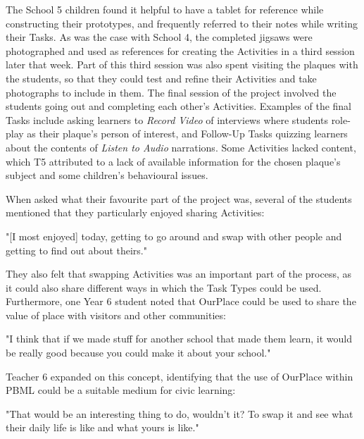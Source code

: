 The School 5 children found it helpful to have a tablet for reference while constructing their prototypes, and frequently referred to their notes while writing their Tasks. As was the case with School 4, the completed jigsaws were photographed and used as references for creating the Activities in a third session later that week. Part of this third session was also spent visiting the plaques with the students, so that they could test and refine their Activities and take photographs to include in them. The final session of the project involved the students going out and completing each other's Activities. Examples of the final Tasks include asking learners to \textit{Record Video} of interviews where students role-play as their plaque's person of interest, and Follow-Up Tasks quizzing learners about the contents of \textit{Listen to Audio} narrations. Some Activities lacked content, which T5 attributed to a lack of available information for the chosen plaque's subject and some children's behavioural issues.

When asked what their favourite part of the project was, several of the students mentioned that they particularly enjoyed sharing Activities: 

\begin{displayquote}
"[I most enjoyed] today, getting to go around and swap with other people and getting to find out about theirs."
\end{displayquote}

They also felt that swapping Activities was an important part of the process, as it could also share different ways in which the Task Types could be used. Furthermore, one Year 6 student noted that OurPlace could be used to share the value of place with visitors and other communities: 

\begin{displayquote}
"I think that if we made stuff for another school that made them learn, it would be really good because you could make it about your school."
\end{displayquote}

Teacher 6 expanded on this concept, identifying that the use of OurPlace within PBML could be a suitable medium for civic learning: 

\begin{displayquote}
"That would be an interesting thing to do, wouldn't it? To swap it and see what their daily life is like and what yours is like." 
\end{displayquote}

